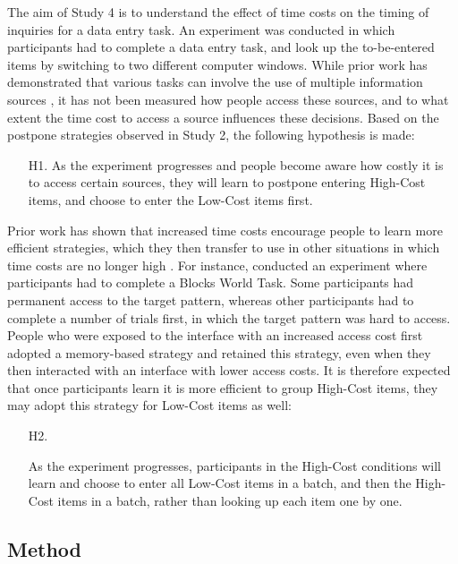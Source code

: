 The aim of Study 4 is to understand the effect of time costs on the timing of inquiries for a data entry task. An experiment was conducted in which participants had to complete a data entry task, and look up the to-be-entered items by switching to two different computer windows. While prior work has demonstrated that various tasks can involve the use of multiple information sources \citep{Cangiano2009, Murphy2016, Su2013}, it has not been measured how people access these sources, and to what extent the time cost to access a source influences these decisions. Based on the postpone strategies observed in Study 2, the following hypothesis is made:

\begin{itemize}
\item [H1.]
As the experiment progresses and people become aware how costly it is to access certain sources, they will learn to postpone entering High-Cost items, and choose to enter the Low-Cost items first. 
\end{itemize}

Prior work has shown that increased time costs encourage people to learn more efficient strategies, which they then transfer to use in other situations in which time costs are no longer high \citep{OHara1998, Patrick2014, Waldron2007}. For instance, \citet{Patrick2014} conducted an experiment where participants had to complete a Blocks World Task. Some participants had permanent access to the target pattern, whereas other participants had to complete a number of trials first, in which the target pattern was hard to access. People who were exposed to the interface with an increased access cost first adopted a memory-based strategy and retained this strategy, even when they then interacted with an interface with lower access costs. It is therefore expected that once participants learn it is more efficient to group High-Cost items, they may adopt this strategy for Low-Cost items as well:

\begin{itemize}
\item [H2.]

As the experiment progresses, participants in the High-Cost conditions will learn and choose to enter all Low-Cost items in a batch, and then the High-Cost items in a batch, rather than looking up each item one by one.

\end{itemize}

\subsection{Method}
